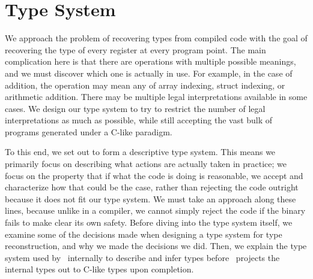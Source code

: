 \section{Type System}
\label{sec:typesys}
We approach the problem of recovering types from compiled code with the goal of recovering the type of every register at every program point. The main complication here is that there are operations with multiple possible meanings, and we must discover which one is actually in use. For example, in the case of addition, the operation may mean any of array indexing, struct indexing, or arithmetic addition.
There may be multiple legal interpretations available in some cases.
We design our type system to try to restrict the number of legal interpretations as much as possible, while still accepting the vast bulk of programs generated under a C-like paradigm.

To this end, we set out to form a descriptive type system. This means we primarily focus on describing what actions are actually taken in practice; we focus on the property that if what the code is doing is reasonable, we accept and characterize how that could be the case, rather than rejecting the code outright because it does not fit our type system.
We must take an approach along these lines, because unlike in a compiler, we cannot simply reject the code if the binary fails to make clear its own safety. Before diving into the type system itself, we examine some of the decisions made when designing a type system for type reconstruction, and why we made the decisions we did. Then, we explain the type system used by \bitr\ internally to describe and infer types before \bitr\ projects the internal types out to C-like types upon completion.

